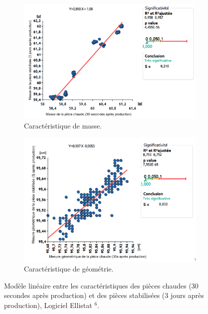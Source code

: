 \begin{figure}[btp]
	\centering
	\begin{subfigure}[c]{0.48\textwidth}
		\includegraphics[width=\textwidth]{../Chap2/Figures/Capture_2019-09-20_12_19_12.png}
		\caption{Caractéristique de masse.}
	\end{subfigure}
	\begin{subfigure}[c]{0.48\textwidth}
		\includegraphics[width=\textwidth]{../Chap2/Figures/Capture_2019-09-20_12_18_57.png}
		\caption{Caractéristique de géométrie.}
	\end{subfigure}
	\caption{Modèle linéaire entre les caractéristiques des pièces chaudes (30 secondes après production) et des pièces stabilisées (3 jours après production), Logiciel Ellistat $^6$.}
	\label{fig:corr_results}
\end{figure}
{}


